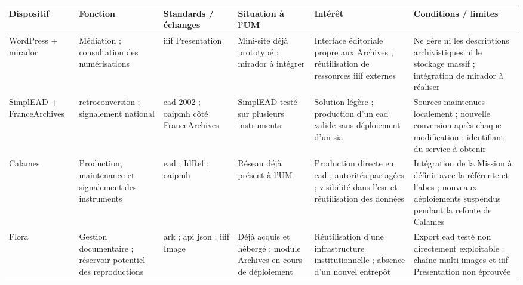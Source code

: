 \begin{table}[htbp]
	\centering
	\tiny
	\setlength{\tabcolsep}{2pt}
	\renewcommand{\arraystretch}{1.15}
	\begin{tabularx}{\textwidth}{
			>{\raggedright\arraybackslash}p{1.75cm}
			>{\raggedright\arraybackslash}p{1.8cm}
			>{\raggedright\arraybackslash}p{2.15cm}
			>{\raggedright\arraybackslash}p{1.9cm}
			>{\raggedright\arraybackslash}X
			>{\raggedright\arraybackslash}X
		}
		\toprule
		\textbf{Dispositif} &
		\textbf{Fonction} &
		\textbf{Standards / échanges} &
		\textbf{Situation à l'UM} &
		\textbf{Intérêt} &
		\textbf{Conditions / limites} \\
		\midrule
		
		WordPress + \gls{mirador}
		& Médiation ; consultation des numérisations
		& \gls{iiif} Presentation
		& Mini-site déjà prototypé ; \gls{mirador} à intégrer
		& Interface éditoriale propre aux Archives ; réutilisation de ressources \gls{iiif} externes
		& Ne gère ni les descriptions archivistiques ni le stockage massif ; intégration de \gls{mirador} à réaliser \\
		
		\addlinespace
		
		SimplEAD + FranceArchives
		& \Gls{retroconversion} ; \gls{signalement} national
		& \gls{ead} 2002 ; \gls{oaipmh} côté FranceArchives
		& SimplEAD testé sur plusieurs instruments
		& Solution légère ; production d'un \gls{ead} valide sans déploiement d'un \gls{sia}
		& Sources maintenues localement ; nouvelle conversion après chaque modification ; identifiant du service à obtenir \\
		
		\addlinespace
		
		Calames
		& Production, maintenance et \gls{signalement} des instruments
		& \gls{ead} ; IdRef ; \gls{oaipmh}
		& Réseau déjà présent à l'UM
		& Production directe en \gls{ead} ; autorités partagées ; visibilité dans l'\gls{esr} et réutilisation des données
		& Intégration de la Mission à définir avec la référente et l'\Gls{abes} ; nouveaux déploiements suspendus pendant la refonte de Calames \\
		
		\addlinespace
		
		Flora
		& Gestion documentaire ; réservoir potentiel des reproductions
		& \gls{ark} ; \gls{api} \gls{json} ; \gls{iiif} Image
		& Déjà acquis et hébergé ; module Archives en cours de déploiement
		& Réutilisation d'une infrastructure institutionnelle ; absence d'un nouvel entrepôt
		& Export \gls{ead} testé non directement exploitable ; chaîne multi-images et \gls{iiif} Presentation non éprouvée \\
		

\end{tabularx}
\end{table}
